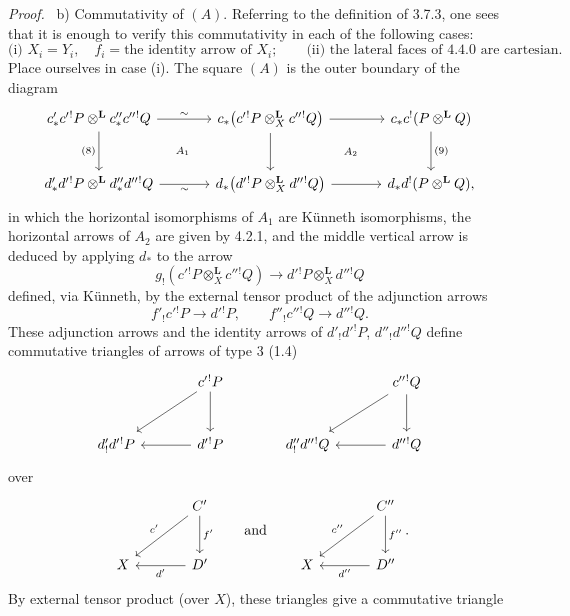 \documentclass[11pt]{article}
\newenvironment{prooftext}[1][Proof]{\par\noindent\emph{#1.}\ }{\par\medskip}
\begin{document}
\begin{prooftext}[Proof]
b) Commutativity of $(A)$. Referring to the definition of 3.7.3, one sees that it is enough to verify this commutativity in each of the following cases:
\[
\text{(i) } X_i=Y_i,\quad f_i=\text{the identity arrow of }X_i;\qquad
\text{(ii) the lateral faces of 4.4.0 are cartesian.}
\]
Place ourselves in case (i). The square $(A)$ is the outer boundary of the diagram
\[
\begin{tikzcd}[column sep=large,row sep=large]
c'_*c'{}^!P\otimes^{\mathbf L}c''_*c''{}^!Q
 \arrow[r,"\sim"] \arrow[d,"(8)"'] &
c_*\bigl(c'{}^!P\otimes_X^{\mathbf L}c''{}^!Q\bigr)
 \arrow[r] \arrow[d] &
c_*c^!(P\otimes^{\mathbf L}Q)\arrow[d,"(9)"]\\
d'_*d'{}^!P\otimes^{\mathbf L}d''_*d''{}^!Q
 \arrow[r,"\sim"'] &
d_*\bigl(d'{}^!P\otimes_X^{\mathbf L}d''{}^!Q\bigr)
 \arrow[r] &
d_*d^!(P\otimes^{\mathbf L}Q),
\arrow[from=1-1,to=2-2,phantom,"\scriptstyle A_1"]
\arrow[from=1-2,to=2-3,phantom,"\scriptstyle A_2"]
\end{tikzcd}
\]
in which the horizontal isomorphisms of $A_1$ are Künneth isomorphisms, the horizontal arrows of $A_2$ are given by 4.2.1, and the middle vertical arrow is deduced by applying $d_*$ to the arrow
\[
g_!(c'{}^!P\otimes_X^{\mathbf L}c''{}^!Q)\longrightarrow d'{}^!P\otimes_X^{\mathbf L}d''{}^!Q
\]
defined, via Künneth, by the external tensor product of the adjunction arrows
\[
f'_!c'{}^!P\longrightarrow d'{}^!P,\qquad
f''_!c''{}^!Q\longrightarrow d''{}^!Q.
\]
These adjunction arrows and the identity arrows of $d'_!d'{}^!P$, $d''_!d''{}^!Q$ define commutative triangles of arrows of type $3$ (1.4)
\[
\begin{tikzcd}[column sep=large,row sep=large]
& c'{}^!P \arrow[d] \arrow[dl] & & c''{}^!Q \arrow[d]\arrow[dl]\\
d'_!d'{}^!P & d'{}^!P\arrow[l] & d''_!d''{}^!Q & d''{}^!Q\arrow[l]
\end{tikzcd}
\]
over
\[
\begin{tikzcd}[column sep=large,row sep=large]
& C' \arrow[d,"f'"] \arrow[dl,"c'"']\\
X & D'\arrow[l,"d'"]
\end{tikzcd}
\qquad\text{and}\qquad
\begin{tikzcd}[column sep=large,row sep=large]
& C'' \arrow[d,"f''"] \arrow[dl,"c''"']\\
X & D''\arrow[l,"d''"]
\end{tikzcd}.
\]
By external tensor product (over $X$), these triangles give a commutative triangle
\[
\begin{tikzcd}[column sep=huge,row sep=large]

\end{tikzcd}\]
\end{prooftext}
\end{document}
